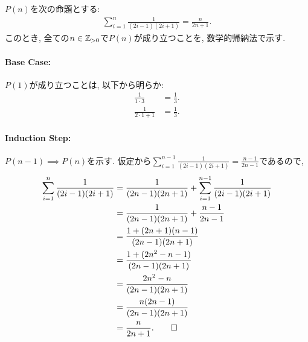 \begin{proof*}
  $P(n)$を次の命題とする:
  \begin{align*}
    \sum_{i=1}^n\frac{1}{(2i-1)(2i+1)}=\frac{n}{2n+1}.
  \end{align*}
  このとき,
  全ての$n\in\mathbb{Z}_{>0}$で$P(n)$が成り立つことを,
  数学的帰納法で示す.

  \paragraph{Base Case:}
  $P(1)$が成り立つことは, 以下から明らか:
  \begin{align*}
    \frac{1}{1\cdot 3}&=\frac{1}{3}.\\
    \frac{1}{2\cdot 1+1}&=\frac{1}{3}.
  \end{align*}

  \paragraph{Induction Step:}
  $P(n-1)\implies P(n)$を示す.
  仮定から$\sum_{i=1}^{n-1}\frac{1}{(2i-1)(2i+1)}=\frac{n-1}{2n-1}$であるので,
  \begin{align*}
    \sum_{i=1}^n\frac{1}{(2i-1)(2i+1)}
    &=\frac{1}{(2n-1)(2n+1)}+\sum_{i=1}^{n-1}\frac{1}{(2i-1)(2i+1)}\\
    &=\frac{1}{(2n-1)(2n+1)}+\frac{n-1}{2n-1}\\
    &=\frac{1+(2n+1)(n-1)}{(2n-1)(2n+1)}\\
    &=\frac{1+(2n^2-n-1)}{(2n-1)(2n+1)}\\
    &=\frac{2n^2-n}{(2n-1)(2n+1)}\\
    &=\frac{n(2n-1)}{(2n-1)(2n+1)}\\
    &=\frac{n}{2n+1}
    .\qedhere
  \end{align*}
\end{proof*}

